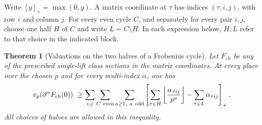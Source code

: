\documentclass[a4paper,11pt]{article}
\newtheorem{theorem}[proposition]{Theorem}
\theoremstyle{definition}
\theoremstyle{remark}
\numberwithin{equation}{section}
\begin{document}
Write \([y]_+=\max(0,y)\). A matrix coordinate at \(\tau\) has
indices \((\tau,i,j)\), with row \(i\) and column \(j\).
For every even cycle \(C\), and separately for every pair \(i,j\),
choose one half \(H\) of \(C\) and write \(L=C\setminus H\).
In each expression below, \(H,L\) refer to that choice in the
indicated block.

\begin{theorem}[Valuations on the two halves of a Frobenius cycle]\label{thm:ramp67}
Let \(F_{ch}\) be any of the prescribed single-lift class sections
in the matrix coordinates. At every place over the chosen \(p\)
and for every multi-index \(\alpha\), one has
\begin{align}
 v_p(\partial^\alpha F_{ch}(0))\ \ge \sum_{i,j}\sum_{C\ {\rm even}}\sum_{a\ge1,\ a\ {\rm odd}}
  \left[\sum_{\tau\in H}
               \left\lfloor\frac{\alpha_{\tau ij}}{p^a}\right\rfloor
                        -\sum_{\tau\in L}\alpha_{\tau ij}\right]_+ .
                                                     \label{eq:ramp67}
\end{align}
All choices of halves are allowed in this inequality.
\end{theorem}
\end{document}
